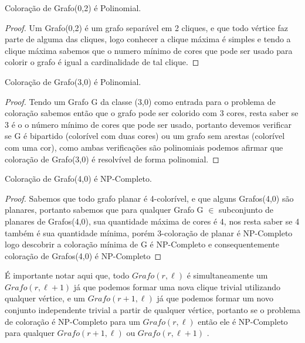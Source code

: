 	\begin{teorema}
		Coloração de Grafo(0,2) é Polinomial.
	\end{teorema}
	\begin{proof}
		Um Grafo(0,2) é um grafo separável em 2 cliques, e que todo vértice faz parte de alguma das cliques, logo conhecer a clique máxima é simples e tendo a clique máxima sabemos que o numero mínimo de cores que pode ser usado para colorir o grafo é igual a cardinalidade de tal clique.
	\end{proof}

	\begin{teorema}
		Coloração de Grafo(3,0) é Polinomial.
	\end{teorema}
	\begin{proof}
		Tendo um Grafo G da classe (3,0) como entrada para o problema de coloração sabemos então que o grafo pode ser colorido com 3 cores, resta saber se 3 é o o número mínimo de cores que pode ser usado, portanto devemos verificar se G é bipartido (colorível com duas cores) ou um grafo sem arestas (colorível com uma cor), como ambas verificações são polinomiais podemos afirmar que coloração de Grafo(3,0) é resolvível de forma polinomial.
	\end{proof}

	\begin{teorema}
		Coloração de Grafo(4,0) é NP-Completo.
	\end{teorema}
	\begin{proof}
		Sabemos que todo grafo planar é 4-colorível, e que alguns Grafos(4,0) são planares, portanto sabemos que para qualquer Grafo G $\in$ subconjunto de planares de Grafos(4,0), sua quantidade máxima de cores é 4, nos resta saber se 4 também é sua quantidade mínima, porém 3-coloração de planar é NP-Completo logo descobrir a coloração mínima de G é NP-Completo e consequentemente coloração de Grafos(4,0) é NP-Completo
	\end{proof}

É importante notar aqui que, todo $Grafo(r,\ell)$ é simultaneamente um $Grafo(r,\ell+1)$ já que podemos formar uma nova clique trivial utilizando qualquer vértice, e um $Grafo(r+1,\ell)$ já que podemos formar um novo conjunto independente trivial a partir de qualquer vértice, portanto se o problema de coloração é NP-Completo para um $Grafo(r,\ell)$ então ele é NP-Completo para qualquer $Grafo(r+1,\ell)$ ou $Grafo(r,\ell+1)$ .

